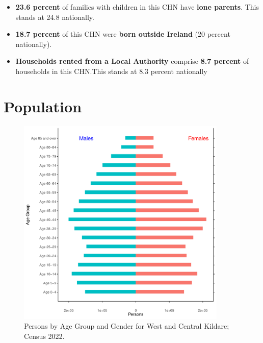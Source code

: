 \documentclass{article}
\begin{document}
\begin{itemize}
\item \textbf{23.6 percent} of families with children in this CHN have \textbf{lone parents}. This stands at 24.8 nationally.

\item \textbf{18.7 percent} of this CHN were \textbf{born outside Ireland} (20 percent nationally).

\item \textbf{Households rented from a Local Authority} comprise \textbf{8.7 percent} of households in this CHN.This stands at 8.3 percent nationally

\end{itemize}

\pagebreak

\section{Population} 
\label{sect:Pop}

\begin{figure}[h]
	\centering
	\includegraphics[width = 100mm]{../figures/PyramidPlot.pdf}
	\caption{Persons by Age Group and Gender for West and Central Kildare; Census 2022.}
	\label{fig:2ae19629-1a6a-13a3-e055-000000000001}
	\end{figure}
\end{document}
